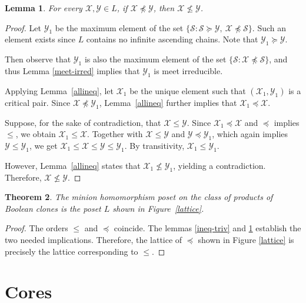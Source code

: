 \documentclass{amsart}
\numberwithin{equation}{section}
\theoremstyle{plain}
\newtheorem{theorem}{Theorem}[section]
\newtheorem{lemma}[theorem]{Lemma}
\theoremstyle{definition}
\def\clone#1{\mathcal{#1}}
\begin{document}
\begin{lemma}
\label{final}
  For every $\clone{X},\clone{Y}\in L$, if $\clone{X}\not\preceq \clone{Y}$, then $\clone{X}\not\leq \clone{Y}$.
\end{lemma}
\begin{proof}
  Let $\clone{Y}_1$ be the maximum element of the set $\{\clone{S}: \clone{S}\succeq \clone{Y},\ \clone{X}\not\preceq \clone{S}\}$. Such an element exists since $L$ contains no infinite ascending chains. Note that $\clone{Y}_1\succeq \clone{Y}$. 
  
  Then observe that $\clone{Y}_1$ is also the maximum element of the set $\{\clone{S}: \clone{X}\not\preceq \clone{S}\}$, and thus Lemma \ref{meet-irred} implies that $\clone{Y}_1$ is meet irreducible. 

Applying Lemma~\ref{allineq}, let $\clone{X}_1$ be the unique element such that $(\clone{X}_1,\clone{Y}_1)$ is a critical pair. Since $\clone{X}\not\preceq \clone{Y}_1$, Lemma~\ref{allineq} further implies that $\clone{X}_1\preceq \clone{X}$.

Suppose, for the sake of contradiction, that $\clone{X}\leq \clone{Y}$. Since $\clone{X}_1\preceq \clone{X}$ and $\preceq$ implies $\leq$, we obtain $\clone{X}_1\leq \clone{X}$. Together with $\clone{X}\leq\clone{Y}$ and $\clone{Y}\preceq\clone{Y}_1$, which again implies $\clone{Y}\leq\clone{Y}_1$, we get $\clone{X}_1\leq \clone{X}\leq \clone{Y}\leq \clone{Y}_1$. By transitivity, $\clone{X}_1\leq \clone{Y}_1$.

However, Lemma~\ref{allineq} states that $\clone{X}_1\not\leq \clone{Y}_1$, yielding a contradiction. Therefore, $\clone{X}\not\leq \clone{Y}$.
\end{proof}

\begin{theorem}  
The minion homomorphism poset on the class of products of Boolean clones is the poset $L$ shown in Figure~\ref{lattice}.
\end{theorem}
\begin{proof}
The orders $\leq$ and $\preceq$ coincide. The lemmas \ref{ineq-triv} and \ref{final} establish the two needed implications. Therefore, the lattice of $\preceq$ shown in Figure \ref{lattice} is precisely the lattice corresponding to $\leq$.
\end{proof}

\section{Cores}
\end{document}
